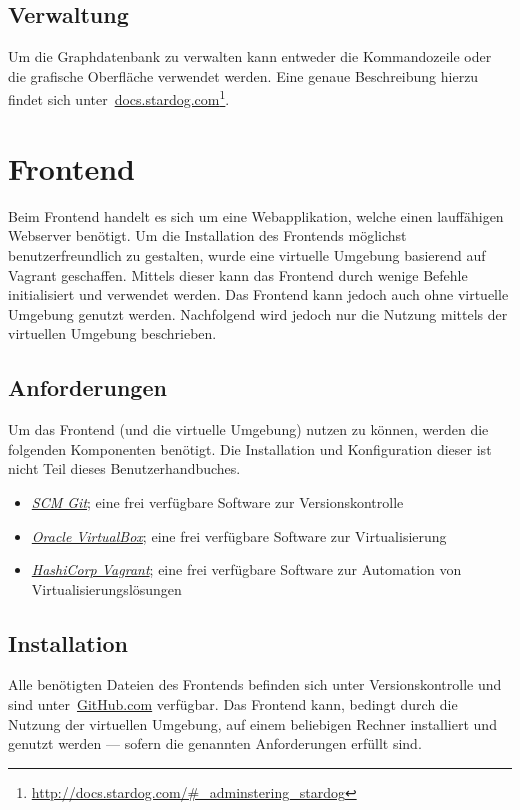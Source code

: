 \subsection{Verwaltung}
\label{chap:anh:ihb:backend:mgmt}
Um die Graphdatenbank zu verwalten kann entweder die Kommandozeile oder die grafische Oberfläche verwendet werden. Eine genaue Beschreibung hierzu findet sich unter~\href{http://docs.stardog.com/#_adminstering_stardog}{docs.stardog.com}\footnote{\url{http://docs.stardog.com/#_adminstering_stardog}}.


\section{Frontend}
\label{chap:anh:ihb:frontend}
Beim Frontend handelt es sich um eine Webapplikation, welche einen lauffähigen Webserver benötigt. Um die Installation des Frontends möglichst benutzerfreundlich zu gestalten, wurde eine virtuelle Umgebung basierend auf Vagrant geschaffen. Mittels dieser kann das Frontend durch wenige Befehle initialisiert und verwendet werden. Das Frontend kann jedoch auch ohne virtuelle Umgebung genutzt werden. Nachfolgend wird jedoch nur die Nutzung mittels der virtuellen Umgebung beschrieben.

\subsection{Anforderungen}
\label{chap:anh:ihb:frontend:req}
Um das Frontend (und die virtuelle Umgebung) nutzen zu können, werden die folgenden Komponenten benötigt. Die Installation und Konfiguration dieser ist nicht Teil dieses Benutzerhandbuches.
\begin{itemize}
    \item \textit{\href{http://git-scm.com/}{SCM Git}}; eine frei verfügbare Software zur Versionskontrolle
    \item \textit{\href{https://www.virtualbox.org/wiki/Downloads}{Oracle VirtualBox}}; eine frei verfügbare Software zur Virtualisierung
    \item \textit{\href{https://www.vagrantup.com/downloads.html}{HashiCorp Vagrant}}; eine frei verfügbare Software zur Automation von Virtualisierungslösungen
\end{itemize}

\subsection{Installation}
\label{chap:anh:ihb:frontend:install}
Alle benötigten Dateien des Frontends befinden sich unter Versionskontrolle und sind unter~\href{https://github.com/gunzm1/ElephantSearch}{GitHub.com} verfügbar. Das Frontend kann, bedingt durch die Nutzung der virtuellen Umgebung, auf einem beliebigen Rechner installiert und genutzt werden --- sofern die genannten Anforderungen erfüllt sind.

